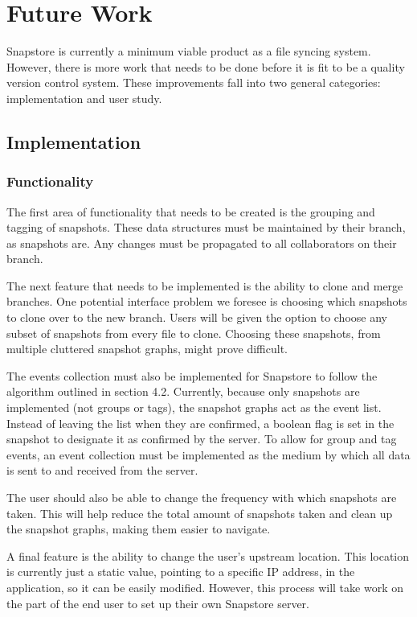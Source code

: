 \chapter{Future Work}

Snapstore is currently a minimum viable product as a file syncing system. However, there is more work that needs to be done before it is fit to be a quality version control system. These improvements fall into two general categories: implementation and user study. 

\section{Implementation}

\subsection{Functionality}

The first area of functionality that needs to be created is the grouping and tagging of snapshots. These data structures must be maintained by their branch, as snapshots are. Any changes must be propagated to all collaborators on their branch.

The next feature that needs to be implemented is the ability to clone and merge branches. One potential interface problem we foresee is choosing which snapshots to clone over to the new branch. Users will be given the option to choose any subset of snapshots from every file to clone. Choosing these snapshots, from multiple cluttered snapshot graphs, might prove difficult.

The events collection must also be implemented for Snapstore to follow the algorithm outlined in section 4.2. Currently, because only snapshots are implemented (not groups or tags), the snapshot graphs act as the event list. Instead of leaving the list when they are confirmed, a boolean flag is set in the snapshot to designate it as confirmed by the server. To allow for group and tag events, an event collection must be implemented as the medium by which all data is sent to and received from the server.

The user should also be able to change the frequency with which snapshots are taken. This will help reduce the total amount of snapshots taken and clean up the snapshot graphs, making them easier to navigate.

A final feature is the ability to change the user's upstream location. This location is currently just a static value, pointing to a specific IP address, in the application, so it can be easily modified. However, this process will take work on the part of the end user to set up their own Snapstore server.

